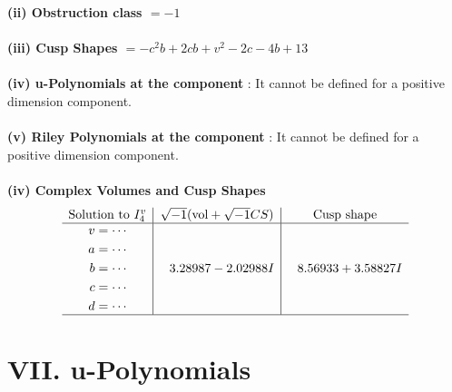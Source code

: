 \documentclass[1p]{elsarticle_modified}
\theoremstyle{definition}
\newcommand{\I}{\sqrt{-1}}
\begin{document}
\flushleft \textbf{(ii) Obstruction class $= -1$}\\~\\
\flushleft \textbf{(iii) Cusp Shapes $= - c^2 b+2 c b+v^2-2 c-4 b+13$}\\~\\
\flushleft \textbf{(iv) u-Polynomials at the component} : It cannot be defined for a positive dimension component.\\~\\
\flushleft \textbf{(v) Riley Polynomials at the component} : It cannot be defined for a positive dimension component.\\~\\
\newpage\flushleft \textbf{(iv) Complex Volumes and Cusp Shapes}
$$\begin{array}{c|c|c} 
\text{Solution to }I^v_{4}& \I (\text{vol} + \sqrt{-1}CS) & \text{Cusp shape}\\
 \hline 
\begin{aligned}
v &= \cdots \\
a &= \cdots \\
b &= \cdots \\
c &= \cdots \\
d &= \cdots\end{aligned}
 & \phantom{-}3.28987 - 2.02988 I & \phantom{-}8.56933 + 3.58827 I\\
 \hline 
 \end{array}
$$
\newpage\renewcommand{\arraystretch}{1}
\centering \section*{ VII. u-Polynomials}
\end{document}
